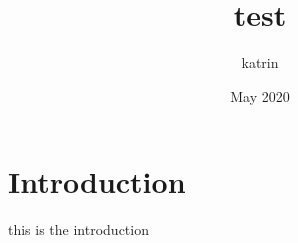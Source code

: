 \documentclass{article}
\title{test}
\author{katrin }
\date{May 2020}
\begin{document}
\maketitle

\section{Introduction}
this is the introduction
\end{document}
